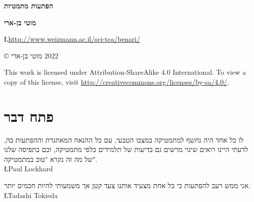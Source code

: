 
\pagestyle{empty}

\begin{center}
\textbf{\Huge הפתעות מתמטיות}
 
\bigskip
\bigskip
\bigskip
\bigskip

\textbf{\Large מוטי בן-ארי}

\bigskip
\bigskip


\L{\url{http://www.weizmann.ac.il/sci-tea/benari/}}
\end{center}


\vfill

\begin{center}
\copyright{} מוטי בן-ארי
$2022$
 \end{center}

\begin{english}
\begin{small}
This work is licensed under Attribution-ShareAlike 4.0 International. To view a copy of this license, visit \url{http://creativecommons.org/licenses/by-sa/4.0/}.

\end{small}
\end{english}



\thispagestyle{empty}
\pagestyle{plain}

\chapter*{פתח דבר}
\thispagestyle{empty}

\begin{flushleft}
\parbox{7cm}{
\begin{small}
\begin{flushleft}
לו כל אחד היה נחשף למתמטיקה במצבו הטבעי, עם כל ההנאה המאתגרת וההפתעות בה, לדעתי היינו רואים שינוי מרשים גם בדיעות של תלמידים כלפי מתמטיקה, וכם בתפיסה שלנו של מה זה נקרא "טוב במתמטיקה".\\
\L{Paul Lockhard}

\smallskip

אני ממש רעב להפתעות כי כל אחת מצעיד אותנו צעד קטן אך משמעותי להיות חכמים יותר.\\
\L{Tadashi Tokieda}
\end{flushleft}
\end{small}
}
\end{flushleft}

